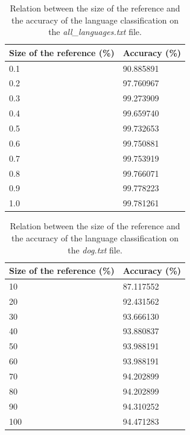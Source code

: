 \documentclass{article}
\begin{document}
\begin{table}
    \centering
    \begin{tabular}{|l|l|}
    \hline
        Size of the reference (\%) & Accuracy (\%) \\ \hline
        0.1 & 90.885891 \\ \hline
        0.2 & 97.760967 \\ \hline
        0.3 & 99.273909 \\ \hline
        0.4 & 99.659740 \\ \hline
        0.5 & 99.732653 \\ \hline
        0.6 & 99.750881 \\ \hline
        0.7 & 99.753919 \\ \hline
        0.8 & 99.766071 \\ \hline
        0.9 & 99.778223 \\ \hline
        1.0 & 99.781261 \\ \hline
    \end{tabular}
    \caption{Relation between the size of the reference and the accuracy of the language classification on the \textit{all\_languages.txt} file.}
    \label{tab:rel_size_ref_acc_all}
\end{table}

\begin{table}
    \centering
    \begin{tabular}{|l|l|}
    \hline
        Size of the reference (\%) & Accuracy (\%) \\ \hline
        10 & 87.117552 \\ \hline
        20 & 92.431562 \\ \hline
        30 & 93.666130 \\ \hline
        40 & 93.880837 \\ \hline
        50 & 93.988191 \\ \hline
        60 & 93.988191 \\ \hline
        70 & 94.202899 \\ \hline
        80 & 94.202899 \\ \hline
        90 & 94.310252 \\ \hline
        100 & 94.471283 \\ \hline
    \end{tabular}
    \caption{Relation between the size of the reference and the accuracy of the language classification on the \textit{dog.txt} file.}
    \label{tab:rel_size_ref_acc_dog}
\end{table}
\end{document}
